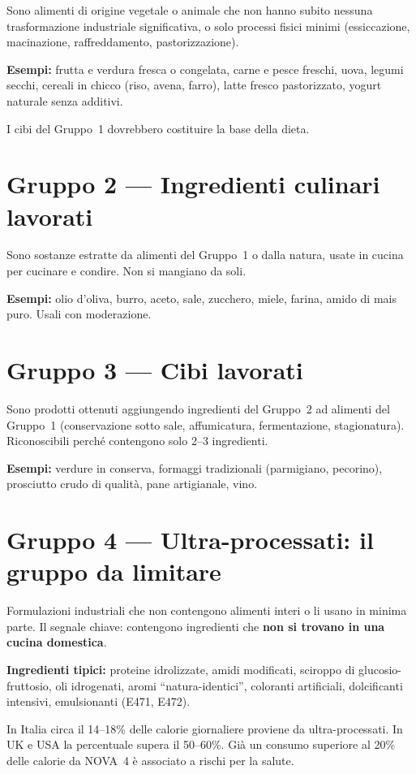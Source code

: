 \documentclass[a5paper,12pt,oneside,openany]{book}
\newcommand{\boxrosso}[2]{%
  \begin{tcolorbox}[boxbase,
    colback=rosso!8!white, colframe=rosso, title={#1}]
  #2\end{tcolorbox}}
\begin{document}
Sono alimenti di origine vegetale o animale che non hanno subito nessuna
trasformazione industriale significativa, o solo processi fisici minimi
(essiccazione, macinazione, raffreddamento, pastorizzazione).

\textbf{Esempi:} frutta e verdura fresca o congelata, carne e pesce
freschi, uova, legumi secchi, cereali in chicco (riso, avena, farro),
latte fresco pastorizzato, yogurt naturale senza additivi.

I cibi del Gruppo~1 dovrebbero costituire la base della dieta.

\section{Gruppo 2 --- Ingredienti culinari lavorati}

Sono sostanze estratte da alimenti del Gruppo~1 o dalla natura, usate in
cucina per cucinare e condire. Non si mangiano da soli.

\textbf{Esempi:} olio d'oliva, burro, aceto, sale, zucchero, miele,
farina, amido di mais puro. Usali con moderazione.

\section{Gruppo 3 --- Cibi lavorati}

Sono prodotti ottenuti aggiungendo ingredienti del Gruppo~2 ad alimenti
del Gruppo~1 (conservazione sotto sale, affumicatura, fermentazione,
stagionatura). Riconoscibili perché contengono solo 2--3 ingredienti.

\textbf{Esempi:} verdure in conserva, formaggi tradizionali (parmigiano,
pecorino), prosciutto crudo di qualità, pane artigianale, vino.

\section{Gruppo 4 --- Ultra-processati: il gruppo da limitare}

Formulazioni industriali che non contengono alimenti interi o li usano
in minima parte. Il segnale chiave: contengono ingredienti che \textbf{non
si trovano in una cucina domestica}.

\textbf{Ingredienti tipici:} proteine idrolizzate, amidi modificati,
sciroppo di glucosio-fruttosio, oli idrogenati, aromi ``natura-identici'',
coloranti artificiali, dolcificanti intensivi, emulsionanti (E471, E472).

\boxrosso{Dati chiave}{In Italia circa il 14--18\% delle calorie
giornaliere proviene da ultra-processati. In UK e USA la percentuale
supera il 50--60\%. Già un consumo superiore al 20\% delle calorie da
NOVA~4 è associato a rischi per la salute.}
\end{document}
